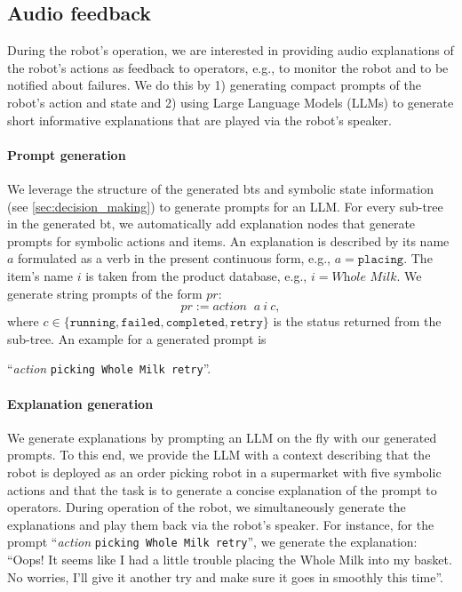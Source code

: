 \subsection{Audio feedback}
\label{sec:language_feedback}

During the robot's operation, we are interested in providing
audio explanations of the robot's actions as feedback to
operators, e.g., to monitor the robot and to be notified
about failures. We do this by 1) generating compact prompts
of the robot's action and state and 2) using Large Language
Models (LLMs) to generate short informative explanations
that are played via the robot's speaker.


\paragraph{Prompt generation}
We leverage the structure of the generated \acp{bt} and
symbolic state information (see \cref{sec:decision_making})
to generate prompts for an LLM. For every sub-tree in the
generated \ac{bt}, we automatically add explanation
nodes that
generate prompts for symbolic actions and items. An
explanation is
described by its name $a$ formulated as a verb in the
present continuous form, e.g., $a=\texttt{placing}$. The
item's name $i$ is taken from the product database, e.g.,
$i=\textit{Whole Milk}$. We generate string prompts of the
form $pr$:
\begin{equation*}
    pr := \textit{action }~a~i~c,
\end{equation*}
where $c\in\{\texttt{running},\texttt{failed}, \texttt{completed}, \texttt{retry}\}$ is the status returned from the sub-tree.
An example for a generated prompt is 
\begin{center}
``\textit{action }\texttt{picking }\texttt{Whole Milk }\texttt{retry}''.
\end{center}


\paragraph{Explanation generation}
We generate explanations by prompting an LLM on the fly with our generated prompts. 
To this end, we provide the LLM with a context describing
that the robot is deployed as an order picking robot in a
supermarket with five symbolic actions and that the task is to generate a concise explanation of the prompt to operators. 
During operation of the robot, we simultaneously generate the explanations and play them back via the robot's speaker.
For instance, for the prompt  ``\textit{action }\texttt{picking }\texttt{Whole Milk }\texttt{retry}'', we generate the explanation: ``Oops! It seems like I had a little trouble placing the Whole Milk into my basket. No worries, I'll give it another
  try and make sure it goes in smoothly this time''.

